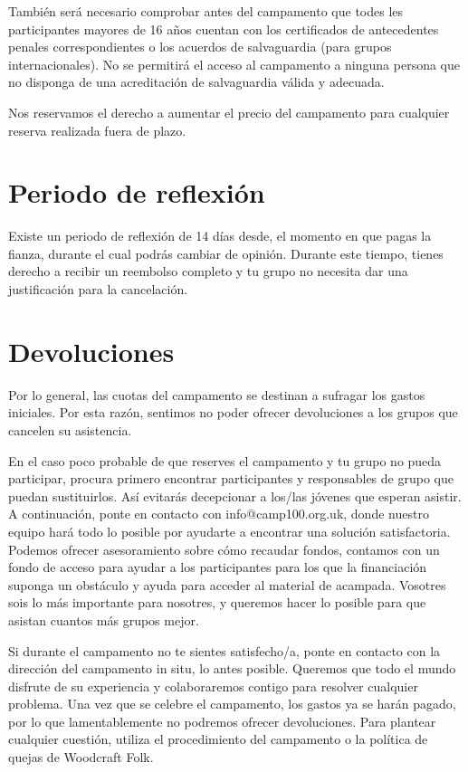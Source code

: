 \documentclass[a4paper, 11pt]{report}
\begin{document}
Tambi\'en ser\'a necesario comprobar antes del campamento que todes les participantes mayores de 16 a\~nos cuentan con los certificados de antecedentes penales correspondientes o los acuerdos de salvaguardia (para grupos internacionales). No se permitir\'a el acceso al campamento a ninguna persona que no disponga de una acreditaci\'on de salvaguardia v\'alida y adecuada. 

Nos reservamos el derecho a aumentar el precio del campamento para cualquier reserva realizada fuera de plazo.


\section{Periodo de reflexi\'on}
Existe un periodo de reflexi\'on de 14 d\'ias desde, el momento en que pagas la fianza, durante el cual podr\'as cambiar de opini\'on. Durante este tiempo, tienes derecho a recibir un reembolso completo y tu grupo no necesita dar una justificaci\'on para la cancelaci\'on. 

\section{Devoluciones}
Por lo general, las cuotas del campamento se destinan a sufragar los gastos iniciales.  Por esta raz\'on, sentimos no poder ofrecer devoluciones a los grupos que cancelen su asistencia. 

En el caso poco probable de que reserves el campamento y tu grupo no pueda participar, procura primero encontrar participantes y responsables de grupo que puedan sustituirlos. As\'i evitar\'as decepcionar a los/las j\'ovenes que esperan asistir. A continuaci\'on, ponte en contacto con info@camp100.org.uk, donde nuestro equipo har\'a todo lo posible por ayudarte a encontrar una soluci\'on satisfactoria. Podemos ofrecer asesoramiento sobre c\'omo recaudar fondos, contamos con un fondo de acceso para ayudar a los participantes para los que la financiaci\'on suponga un obst\'aculo y ayuda para acceder al material de acampada. Vosotres sois lo m\'as importante para nosotres, y queremos hacer lo posible para que asistan cuantos m\'as grupos mejor.
 
Si durante el campamento no te sientes satisfecho/a, ponte en contacto con la direcci\'on del campamento in situ, lo antes posible. Queremos que todo el mundo disfrute de su experiencia y colaboraremos contigo para resolver cualquier problema. Una vez que se celebre el campamento, los gastos ya se har\'an pagado, por lo que lamentablemente no podremos ofrecer devoluciones. Para plantear cualquier cuesti\'on, utiliza el procedimiento del campamento o la pol\'itica de quejas de Woodcraft Folk.
\end{document}
